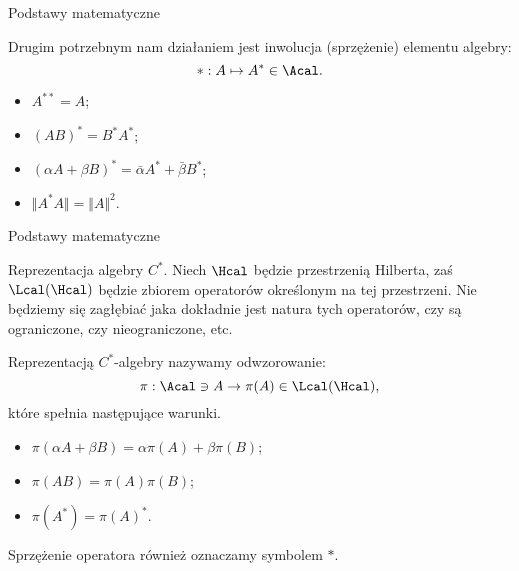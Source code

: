 \documentclass[10pt,t]{beamer}
\begin{document}
\begin{frame}{Podstawy matematyczne}


  Drugim potrzebnym nam działaniem jest inwolucja (sprzężenie) elementu
  algebry:
  \begin{equation}
    \label{eq:2}
    * : A \mapsto A^{ * } \in \Acal.
  \end{equation}

  \begin{itemize}

  \item $A^{ ** } = A$;

  \item $( A B )^{ * } = B^{ * } A^{ * }$;

  \item $( \alpha A + \beta B )^{ * } = \bar{ \alpha } A^{ * } + \bar{ \beta } B^{ * }$;

  \item $\Vert A^{ * } A \Vert = \Vert A \Vert^{ 2 }$.

  \end{itemize}

\end{frame}





\begin{frame}{Podstawy matematyczne}


  Reprezentacja algebry $C^{ * }$. Niech $\Hcal$ będzie przestrzenią
  Hilberta, zaś $\Lcal( \Hcal )$ będzie zbiorem operatorów określonym na tej przestrzeni. Nie będziemy się zagłębiać jaka dokładnie jest natura tych operatorów, czy są ograniczone, czy nieograniczone, etc.

  Reprezentacją $C^{ * }$-algebry nazywamy odwzorowanie:
  \begin{equation}
    \label{eq:3}
    \pi : \Acal \ni A \rightarrow \pi( A ) \in \Lcal( \Hcal ),
  \end{equation}
  które spełnia następujące warunki.
  \begin{itemize}
  \item $\pi( \alpha A + \beta B ) = \alpha \pi( A ) + \beta \pi( B )$;

  \item $\pi( A B ) = \pi( A ) \pi( B )$;

  \item $\pi( A^{ * } ) = \pi( A )^{ * }$.

  \end{itemize}
  Sprzężenie operatora również oznaczamy symbolem $*$.

\end{frame}
\end{document}
